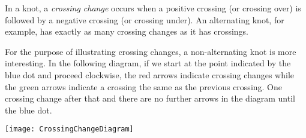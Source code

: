 \documentclass[12pt]{article}
\begin{document}
In a knot, a {\em crossing change} occurs when a positive crossing (or crossing over) is followed by a negative crossing (or crossing under). An alternating knot, for example, has exactly as many crossing changes as it has crossings.

For the purpose of illustrating crossing changes, a non-alternating knot is more interesting. In the following diagram, if we start at the point indicated by the blue dot and proceed clockwise, the red arrows indicate crossing changes while the green arrows indicate a crossing the same as the previous crossing. One crossing change after that and there are no further arrows in the diagram until the blue dot.

\begin{center}
\texttt{[image: CrossingChangeDiagram]}
\end{center}
\end{document}
